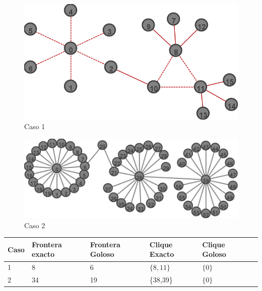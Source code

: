 \begin{figure}[H]
\centering\includegraphics[width=11 cm]{goloso/labl.png}
\caption{Caso 1}
\end{figure}

\begin{figure}[H]
\centering\includegraphics[width=15 cm]{goloso/goloso2.png}
\caption{Caso 2}
\end{figure}

\begin{center}
    \begin{tabular}{ | l | l | l | l | l | p{5cm} |}
    \hline
    Caso & Frontera exacto & Frontera Goloso & Clique Exacto & Clique Goloso \\ \hline
    1 & 8 & 6 & $\{8,11\}$ & $\{0\}$ \\ \hline
    2 & 34 & 19 &\{38,39\}& $\{0\}$ \\
	\hline
    \end{tabular}
\end{center}
